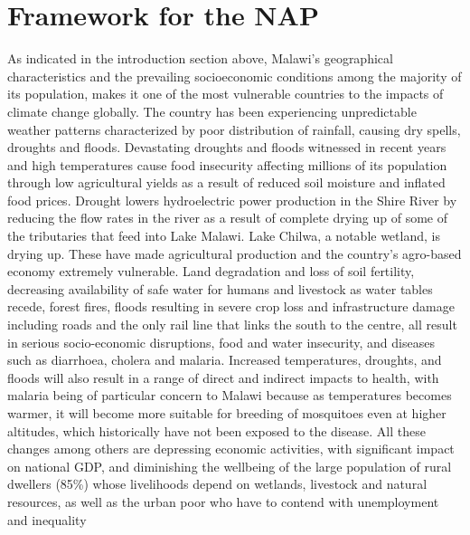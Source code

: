 \documentclass[
]{book}
\begin{document}
\hypertarget{framework-for-the-nap}{%
\chapter{Framework for the NAP}\label{framework-for-the-nap}}

As indicated in the introduction section above, Malawi's geographical characteristics and the prevailing socioeconomic conditions among the majority of its
population, makes it one of the most vulnerable countries to the impacts of climate change globally. The country has been experiencing unpredictable weather
patterns characterized by poor distribution of rainfall, causing dry spells, droughts and floods. Devastating droughts and floods witnessed in recent years and high
temperatures cause food insecurity affecting millions of its population through low agricultural yields as a result of reduced soil moisture and inflated food
prices. Drought lowers hydroelectric power production in the Shire River by reducing the flow rates in the river as a result of complete drying up of some of the
tributaries that feed into Lake Malawi. Lake Chilwa, a notable wetland, is drying up. These have made agricultural production and the country's agro-based economy
extremely vulnerable. Land degradation and loss of soil fertility, decreasing availability of safe water for humans and livestock as water tables recede, forest
fires, floods resulting in severe crop loss and infrastructure damage including roads and the only rail line that links the south to the centre, all result in
serious socio-economic disruptions, food and water insecurity, and diseases such as diarrhoea, cholera and malaria. Increased temperatures, droughts, and floods
will also result in a range of direct and indirect impacts to health, with malaria being of particular concern to Malawi because as temperatures becomes warmer, it
will become more suitable for breeding of mosquitoes even at higher altitudes, which historically have not been exposed to the disease. All these changes among
others are depressing economic activities, with significant impact on national GDP, and diminishing the wellbeing of the large population of rural dwellers (85\%)
whose livelihoods depend on wetlands, livestock and natural resources, as well as the urban poor who have to contend with unemployment and inequality
\end{document}
